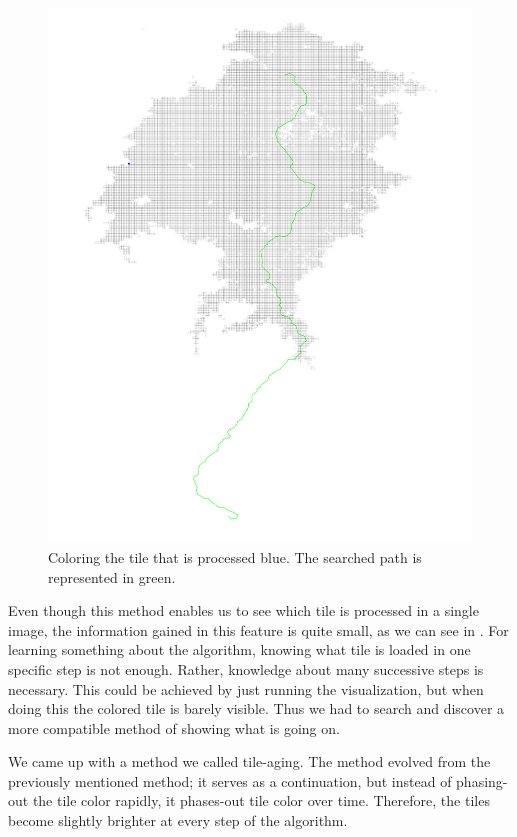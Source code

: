 \documentclass
[
    paper = a4,
    pagesize,
    12 pt,
    twoside,                       %
    open = right,
    DIV = calc,
    BCOR = 0 mm,                   %
    bibtotoc
]
{scrbook}
\begin{document}
\begin{figure}
        \includegraphics[width=\textwidth]{Images/vis-current-tile.png}
\caption[]{Coloring the tile that is processed blue. The searched path is represented in green.}
\label{fig:color_current_tile}
\end{figure}

Even though this method enables us to see which tile is processed in a single image, the information gained in this feature is quite small, as we can see in .
For learning something about the algorithm, knowing what tile is loaded in one specific step is not enough.
Rather, knowledge about many successive steps is necessary.
This could be achieved by just running the visualization, but when doing this the colored tile is barely visible.
Thus we had to search and discover a more compatible method of showing what is going on.

We came up with a method we called tile-aging.
The method evolved from the previously mentioned method; it serves as a continuation, but instead of phasing-out the tile color rapidly, it phases-out tile color over time.
Therefore, the tiles become slightly brighter at every step of the algorithm.
\end{document}
